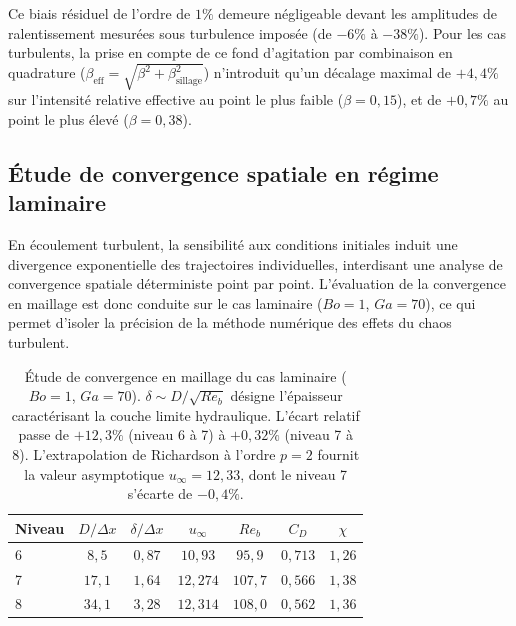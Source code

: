 Ce biais résiduel de l'ordre de $1\%$ demeure négligeable devant les amplitudes de ralentissement mesurées sous turbulence imposée (de $-6\%$ à $-38\%$). Pour les cas turbulents, la prise en compte de ce fond d'agitation par combinaison en quadrature ($\beta_{\text{eff}} = \sqrt{\beta^2 + \beta_{\text{sillage}}^2}$) n'introduit qu'un décalage maximal de $+4{,}4\%$ sur l'intensité relative effective au point le plus faible ($\beta = 0{,}15$), et de $+0{,}7\%$ au point le plus élevé ($\beta = 0{,}38$).


\subsection{Étude de convergence spatiale en régime laminaire}
\label{subsec:convergence}

En écoulement turbulent, la sensibilité aux conditions initiales induit une divergence exponentielle des trajectoires individuelles, interdisant une analyse de convergence spatiale déterministe point par point. L'évaluation de la convergence en maillage est donc conduite sur le cas laminaire ($Bo=1$, $Ga=70$), ce qui permet d'isoler la précision de la méthode numérique des effets du chaos turbulent.

\begin{table}[htbp]
    \centering
    \small
    \renewcommand{\arraystretch}{1.2}
    \begin{tabular}{lcccccc}
        \toprule
        Niveau & $D/\Delta x$ & $\delta/\Delta x$ & $u_\infty$ & $Re_b$ & $C_D$ & $\chi$ \\
        \midrule
        6 & $8{,}5$  & $0{,}87$ & $10{,}93$  & $95{,}9$  & $0{,}713$ & $1{,}26$ \\
        7 & $17{,}1$ & $1{,}64$ & $12{,}274$ & $107{,}7$ & $0{,}566$ & $1{,}38$ \\
        8 & $34{,}1$ & $3{,}28$ & $12{,}314$ & $108{,}0$ & $0{,}562$ & $1{,}36$ \\
        \bottomrule
    \end{tabular}
    \caption{Étude de convergence en maillage du cas laminaire ($Bo=1$, $Ga=70$). $\delta \sim D/\sqrt{Re_b}$ désigne l'épaisseur caractérisant la couche limite hydraulique. L'écart relatif passe de $+12{,}3\%$ (niveau 6 à 7) à $+0{,}32\%$ (niveau 7 à 8). L'extrapolation de Richardson à l'ordre $p=2$ fournit la valeur asymptotique $u_\infty = 12{,}33$, dont le niveau 7 s'écarte de $-0{,}4\%$.}
    \label{tab:convergence}
\end{table}

